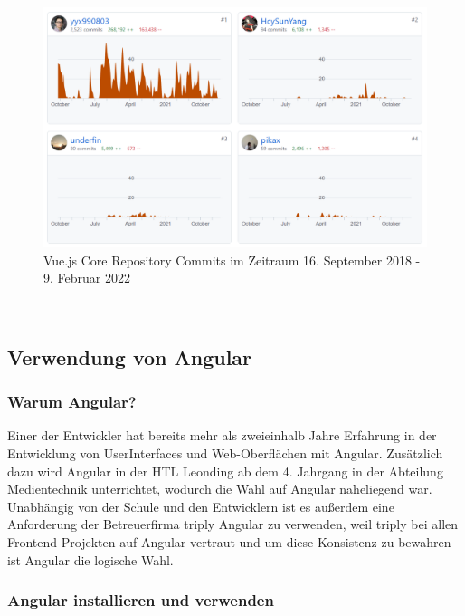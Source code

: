 \begin{figure}[hbt!]
    \centering
    \includegraphics[scale=0.8]{pics/vue_contributions}
    \caption{Vue.js Core Repository Commits im Zeitraum 16. September 2018 - 9. Februar 2022~\cite{VueJSContribution}}
    \label{fig:vue_contributions}
\end{figure}

~\cite{best-frontend-frameworks, best-frontend-framework-2022, angular-vs-react-vs-vue}

\subsection{Verwendung von Angular}

\subsubsection{Warum Angular?}
Einer der Entwickler hat bereits mehr als zweieinhalb Jahre Erfahrung in der Entwicklung von UserInterfaces und Web-Oberflächen mit Angular.
Zusätzlich dazu wird Angular in der HTL Leonding ab dem 4. Jahrgang in der Abteilung Medientechnik unterrichtet, wodurch
die Wahl auf Angular naheliegend war.
Unabhängig von der Schule und den Entwicklern ist es außerdem eine Anforderung der Betreuerfirma triply Angular zu verwenden,
weil triply bei allen Frontend Projekten auf Angular vertraut und um diese Konsistenz zu bewahren ist Angular die logische Wahl.

\subsubsection{Angular installieren und verwenden}

